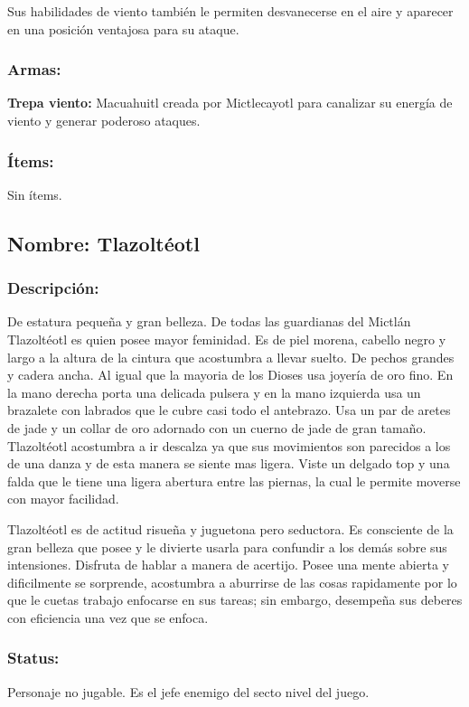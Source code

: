 \documentclass[11pt,letterpaper]{article}
\begin{document}
Sus habilidades de viento también le permiten desvanecerse en el aire y aparecer en una posición ventajosa para su ataque.
\subsubsection{Armas:}
\textbf{Trepa viento:} Macuahuitl creada por Mictlecayotl para canalizar su energía de viento y generar poderoso ataques.
\subsubsection{Ítems:}
Sin ítems.

\subsection{Nombre: Tlazoltéotl}  
\subsubsection{Descripción: }  
De estatura pequeña y gran belleza. De todas las guardianas del Mictlán Tlazoltéotl es quien posee mayor feminidad. Es de piel morena, cabello negro y largo a la altura de la cintura que acostumbra a llevar suelto. De pechos grandes y cadera ancha. Al igual que la mayoria de los Dioses usa joyería de oro fino. En la mano derecha porta una delicada pulsera y en la mano izquierda usa un brazalete con labrados que le cubre casi todo el antebrazo. Usa un par de aretes de jade y un collar de oro adornado con un cuerno de jade de gran tamaño. Tlazoltéotl acostumbra a ir descalza ya que sus movimientos son parecidos a los de una danza y de esta manera se siente mas ligera. Viste un delgado top y una falda que le tiene una ligera abertura entre las piernas, la cual le permite moverse con mayor facilidad.
\\
\par
Tlazoltéotl es de actitud risueña y juguetona pero seductora. Es consciente de la gran belleza que posee y le divierte usarla para confundir a los demás sobre sus intensiones. Disfruta de hablar a manera de acertijo. Posee una mente abierta y dificilmente se sorprende, acostumbra a aburrirse de las cosas rapidamente por lo que le cuetas trabajo enfocarse en sus tareas; sin embargo, desempeña sus deberes con eficiencia una vez que se enfoca.    
\subsubsection{Status:}
Personaje no jugable.
Es el jefe enemigo del secto nivel del juego.
\end{document}

